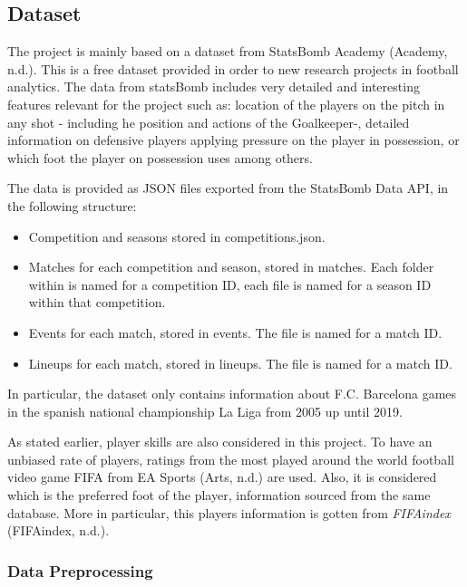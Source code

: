 \documentclass[]{article}
\begin{document}
\hypertarget{dataset}{%
\subsection{Dataset}\label{dataset}}

The project is mainly based on a dataset from StatsBomb Academy
(Academy, n.d.). This is a free dataset provided in order to new
research projects in football analytics. The data from statsBomb
includes very detailed and interesting features relevant for the project
such as: location of the players on the pitch in any shot - including he
position and actions of the Goalkeeper-, detailed information on
defensive players applying pressure on the player in possession, or
which foot the player on possession uses among others.

The data is provided as JSON files exported from the StatsBomb Data API,
in the following structure:

\begin{itemize}
\item
  Competition and seasons stored in competitions.json.
\item
  Matches for each competition and season, stored in matches. Each
  folder within is named for a competition ID, each file is named for a
  season ID within that competition.
\item
  Events for each match, stored in events. The file is named for a match
  ID.
\item
  Lineups for each match, stored in lineups. The file is named for a
  match ID.
\end{itemize}

In particular, the dataset only contains information about F.C.
Barcelona games in the spanish national championship La Liga from 2005
up until 2019.

As stated earlier, player skills are also considered in this project. To
have an unbiased rate of players, ratings from the most played around
the world football video game FIFA from EA Sports (Arts, n.d.) are used.
Also, it is considered which is the preferred foot of the player,
information sourced from the same database. More in particular, this
players information is gotten from \emph{FIFAindex} (FIFAindex, n.d.).

\hypertarget{data-preprocessing}{%
\subsubsection{Data Preprocessing}\label{data-preprocessing}}
\end{document}
